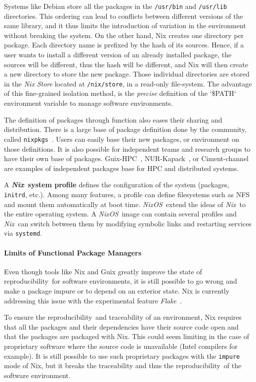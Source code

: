 \documentclass[sigconf]{acmart}
\newcommand{\repro}{reproducibility}
\newcommand{\nix}{\emph{Nix}}
\newcommand{\nixos}{\emph{NixOS}}
\begin{document}
Systems like Debian store all the packages in the \texttt{/usr/bin} and \texttt{/usr/lib} directories.
This ordering can lead to conflicts between different versions of the same library, and it thus limits the introduction of variation in the environment without breaking the system.
On the other hand, Nix creates one directory per package.
Each directory name is prefixed by the hash of its sources.
Hence, if a user wants to install a different version of an already installed package, the sources will be different, thus the hash will be different, and Nix will then create a new directory to store the new package.
Those individual directories are stored in the \emph{Nix Store} located at \texttt{/nix/store}, in a read-only file-system.
The advantage of this fine-grained isolation method, is the \emph{precise} definition of the `\$PATH` environment variable to manage software environments.

The definition of packages through function also eases their sharing and distribution.
There is a large base of package definition done by the community, called \texttt{nixpkgs}\ \cite{nixpkgs}.
Users can easily base their new packages, or environment on those definitions.
It is also possible for independent teams and research groups to have their own base of packages.
Guix-HPC\ \cite{guix-hpc}, NUR-Kapack\ \cite{kapack}, or Ciment-channel\ \cite{ciment_channel} are examples of independent packages base for HPC and distributed systems.

A \textbf{\nix\ system profile} defines the configuration of the system (packages, \texttt{initrd}, etc.).
Among many features, a profile can define filesystems such as NFS and mount them automatically at boot time.
\nixos\ extend the ideas of \nix\ to the entire operating system.
A \nixos\ image can contain several profiles and \nix\ can switch between them by modifying symbolic links and restarting services via \texttt{systemd}.

\paragraph{Limits of Functional Package Managers}

Even though tools like Nix and Guix greatly improve the state of \repro\ for software environments, it is still possible to go wrong and make a package impure or to depend on an exterior state.
Nix is currently addressing this issue with the experimental feature \emph{Flake}\ \cite{flakes}.

To ensure the \repro\ and traceability of an environment, Nix requires that all the packages and their dependencies have their source code open and that the packages are packaged with Nix.
This could seem limiting in the case of proprietary software where the source code is unavailable (Intel compilers for example).
It is still possible to use such proprietary packages with the \texttt{impure} mode of Nix, but it breaks the traceability and thus the \repro\ of the software environment. 
\end{document}
